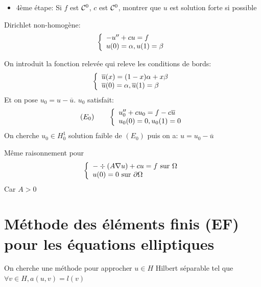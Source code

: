 \documentclass[]{report}
\begin{document}
\begin{itemize}
        $H_0^1$ est muni de la norme induit de $H'$
        \[\norme{u}_{H^1}^2=\norme{u'}_{L^2}^2+\norme{u}_{L^2}^2\]
        $a$ coercive: Soit $u\in H_0^1$,
        \begin{align*}
            a(u,u)&=\int_{0}^{1}|u'|^2 +\int_{0}^{1}cu^2\\
            &\ge \int_{0}^{1}|u'|^2+c_0\int_{0}^{1}u^2\ge \min(1,c_0)\norme{u}_{H^1}^2
        \end{align*}
        $l$ est linéaire par linéarité de l'intégrale.\\
        $l$ est continue:
        \[l(v)=\int_{0}^{1}fv\overset{\text{C-S}}{\le} \left(\int f^2\right)^{\frac{1}{2}}\left(\int v^2\right)^{\frac{1}{2}}\le \norme{f}_{L^2}\norme{v}_{H^1}\]
        D'après le théorème de Lax-Milgram, $\exists!$ solution $u\in H_0^1$ tel que $\forall v\in H_0^1$
        \[\int u'v'+\int c uv=\int fv\]
        \item 4ème étape: Si $f$ est $\mathcal{C}^0$, $c$ est $\mathcal{C}^0$, montrer que $u$ est solution forte si possible
    \end{itemize}

    \begin{re}{}{}
        Dirichlet non-homogène:
        \[\left\{\begin{array}{ll} -u''+cu=f\\ u(0)=\alpha, u(1)=\beta \end{array} \right.\]
    \end{re}

    On introduit la fonction relevée qui releve les conditions de bords:
    \[\left\{\begin{array}{ll} \overline{u}(x)=(1-x)\alpha +x\beta\\ \overline{u}(0)=\alpha, \overline{u}(1)=\beta \end{array} \right.\]
    Et on pose $u_0=u-\overline{u}$. $u_0$ satisfait:
    \[(E_0)\qquad\left\{\begin{array}{ll} u_0''+cu_0=f-c\overline{u}\\ u_0(0)=0,u_0(1)=0 \end{array} \right.\]
    On cherche $u_0\in H_0^1$ solution faible de $(E_0)$ puis on a: $u=u_0-\overline{u}$

    \begin{re}{}{}
        Même raisonnement pour
        \[\left\{\begin{array}{ll} -\div (A\nabla u)+cu=f\text{ sur $\Omega$}\\ u(0)=0\text{ sur $\partial \Omega$} \end{array} \right.\]
        Car $A>0$
    \end{re}

    \chapter{Méthode des éléments finis (EF) pour les équations elliptiques}
    On cherche une méthode pour approcher $u\in H$ Hilbert séparable tel que $\forall v\in H, a(u,v)=l(v)$
\end{document}
